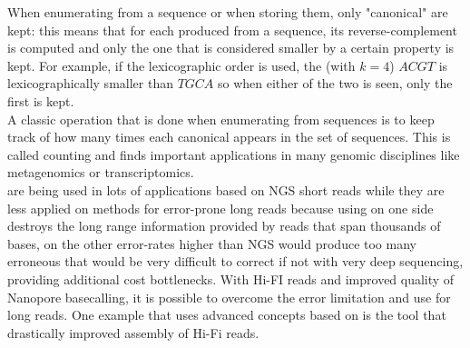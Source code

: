 When enumerating \kmers from a sequence or when storing them, only "canonical" \kmers are kept: this means that for each \kmer produced from a sequence, its reverse-complement is computed and only the one that is considered smaller by a certain property is kept. For example, if the lexicographic order is used, the \kmer (with $k=4$) $ACGT$ is lexicographically smaller than $TGCA$ so when either of the two is seen, only the first is kept.\\
A classic operation that is done when enumerating \kmers from sequences is to keep track of how many times each canonical \kmer appears in the set of sequences. This is called \kmer counting and finds important applications in many genomic disciplines like metagenomics or transcriptomics.\\
\kmers are being used in lots of applications based on NGS short reads while they are less applied on methods for error-prone long reads because using \kmers on one side destroys the long range information provided by reads that span thousands of bases, on the other error-rates higher than NGS would produce too many erroneous \kmers that would be very difficult to correct if not with very deep sequencing, providing additional cost bottlenecks. With Hi-FI reads and improved quality of Nanopore basecalling, it is possible to overcome the error limitation and use \kmers for long reads. One example that uses advanced concepts based on \kmers is the tool \mdbg that drastically improved assembly of Hi-Fi reads.\\ 

